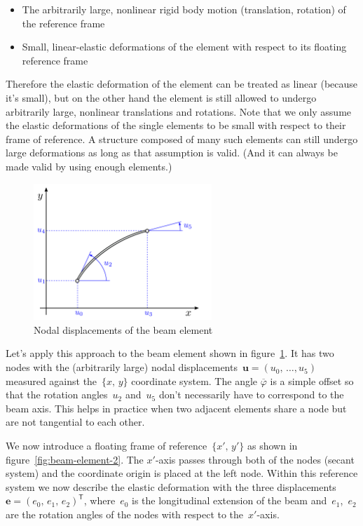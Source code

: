 \begin{itemize}
\item The arbitrarily large, nonlinear rigid body motion (translation, rotation) of the reference frame
\item Small, linear-elastic deformations of the element with respect to its floating reference frame
\end{itemize}

Therefore the elastic deformation of the element can be treated as linear (because it's small), but on the other hand the element is still allowed to undergo arbitrarily large, nonlinear translations and rotations.
Note that we only assume the elastic deformations of the single elements to be small with respect to their frame of reference.
A structure composed of many such elements can still undergo large deformations as long as that assumption is valid. (And it can always be made valid by using enough elements.)

\begin{figure}[h]
\centering
\includegraphics[width=0.6\textwidth]{figures/elements/beam-element-1}
\caption{Nodal displacements of the beam element}
\label{fig:beam-element-1}
\end{figure}

Let's apply this approach to the beam element shown in figure~\ref{fig:beam-element-1}. It has two nodes with the (arbitrarily large) nodal displacements~$\boldsymbol{u} = (u_0,\,\ldots,u_5)$ measured against the~$\{x,\,y\}$ coordinate system. The angle $\overline{\varphi}$ is a simple offset so that the rotation angles~$u_2$ and~$u_5$ don't necessarily have to correspond to the beam axis. This helps in practice when two adjacent elements share a node but are not tangential to each other.

We now introduce a floating frame of reference~$\{x',\,y'\}$ as shown in figure~\ref{fig:beam-element-2}. The $x'$-axis passes through both of the nodes (secant system) and the coordinate origin is placed at the left node. Within this reference system we now describe the elastic deformation with the three displacements~$\boldsymbol{e} = (e_0,\,e_1,\,e_2)^\mathsf{T}$, where~$e_0$ is the longitudinal extension of the beam and~$e_1$,~$e_2$ are the rotation angles of the nodes with respect to the~$x'$-axis.

